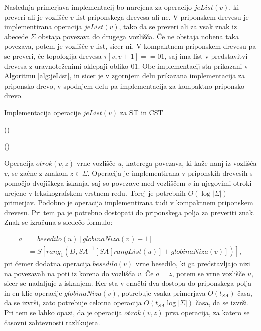 Naslednja primerjava implementacij bo narejena za operacijo $jeList(v)$, ki preveri ali je vozlišče $v$ list priponskega drevesa ali ne. V priponskem drevesu je implementirana operacija $jeList(v)$, tako da se preveri ali za vsak znak iz abecede $\Sigma$ obstaja povezava do drugega vozlišča. Če ne obstaja nobena taka povezava, potem je vozlišče $v$ list, sicer ni. V kompaktnem priponskem drevesu pa se preveri, če topologija drevesa $\tau[v,v+1]==01$, saj ima list v predstavitvi drevesa z uravnoteženimi oklepaji obliko $01$. Obe implementacij sta prikazani v Algoritmu \ref{alg:jeList}, in sicer je v zgornjem delu prikazana implementacija za priponsko drevo, v spodnjem delu pa implementacija za kompaktno priponsko drevo.

\begin{algorithm}[htb]

\caption{Implementacija operacije $jeList(v)$ za ST in CST }\label{alg:jeList}
{
    ()

}

{
    {()}

}

\end{algorithm}

Operacija $otrok(v,z)$ vrne vozlišče $u$, katerega povezava, ki kaže nanj iz vozlišča $v$, se začne z znakom $z\in\Sigma$. Operacija je implementirana v priponskih drevesih s pomočjo dvojiškega iskanja, saj so povezave med vozliščem $v$ in njegovimi otroki urejene v leksikografskem vrstnem redu. Torej je potrebnih $O(\log|\Sigma|)$ primerjav. Podobno je operacija implementirana tudi v kompaktnem priponskem drevesu. Pri tem pa je potrebno dostopati do priponskega polja za preveriti znak. Znak se izračuna s sledečo formulo:

\begin{equation*}
\begin{split}
        a&=besedilo(u)[globinaNiza(v)+1]= \\
        &=S[rang_1(D,SA^{-1}[SA[rangList(u)]+globinaNiza(v)])],
\end{split}   
\end{equation*}
pri čemer dodatna operacija $besedilo(v)$ vrne besedilo, ki ga predstavljajo nizi na povezavah na poti iz korena do vozlišča $v$. Če $a=z$, potem se vrne vozlišče $u$, sicer se nadaljuje z iskanjem. Ker sta v enačbi dva dostopa do priponskega polja in en klic operacije $globinaNiza(v)$, potrebuje vsaka primerjava $O(t_{SA})$ časa, da se izvrši, zato potrebuje celotna operacija $O(t_{SA}\log|\Sigma|)$ časa, da se izvrši. Pri tem se lahko opazi, da je operacija $otrok(v,z)$ prva operacija, za katero se časovni zahtevnosti razlikujeta.

